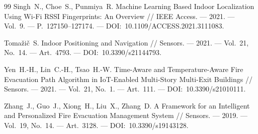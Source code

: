 \begin{thebibliography}{99}
	 Singh~N., Choe~S., Punmiya~R. Machine Learning Based Indoor Localization Using Wi-Fi RSSI Fingerprints: An Overview // IEEE Access. --- 2021. --- Vol.~9. --- P.~127150--127174. --- DOI:~10.1109/ACCESS.2021.3111083.
	
	 Tomažič~S. Indoor Positioning and Navigation // Sensors. --- 2021. --- Vol.~21, No.~14. --- Art.~4793. --- DOI:~10.3390/s21144793.
	
	 Yen~H.-H., Lin~C.-H., Tsao~H.-W. Time-Aware and Temperature-Aware Fire Evacuation Path Algorithm in IoT-Enabled Multi-Story Multi-Exit Buildings // Sensors. --- 2021. --- Vol.~21, No.~1. --- Art.~111. --- DOI:~10.3390/s21010111.
	
	 Zhang~J., Guo~J., Xiong~H., Liu~X., Zhang~D. A Framework for an Intelligent and Personalized Fire Evacuation Management System // Sensors. --- 2019. --- Vol.~19, No.~14. --- Art.~3128. --- DOI:~10.3390/s19143128.
	
\end{thebibliography}
